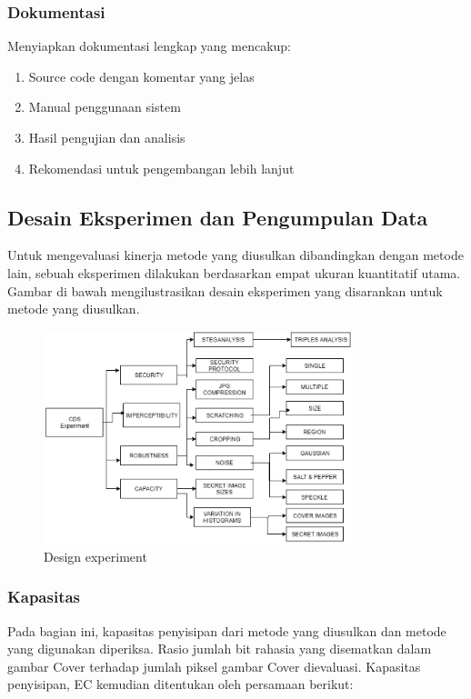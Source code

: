 \documentclass{ittelkom}
\begin{document}
\subsubsection{Dokumentasi}

Menyiapkan dokumentasi lengkap yang mencakup:

\begin{enumerate}
    \item Source code dengan komentar yang jelas
    \item Manual penggunaan sistem
    \item Hasil pengujian dan analisis
    \item Rekomendasi untuk pengembangan lebih lanjut
\end{enumerate}

\subsection{Desain Eksperimen dan Pengumpulan Data}

Untuk mengevaluasi kinerja metode yang diusulkan dibandingkan dengan metode
lain, sebuah eksperimen dilakukan berdasarkan empat ukuran kuantitatif utama.
Gambar di bawah mengilustrasikan desain eksperimen yang disarankan untuk metode
yang diusulkan.

\begin{figure}[h]
    \centering
    \includegraphics[width=0.8\textwidth]{gambar/experiment.png}
    \caption{Design experiment}
    \label{fig:experiment}
\end{figure}

\subsubsection{Kapasitas}

Pada bagian ini, kapasitas penyisipan dari metode yang diusulkan dan metode
yang digunakan diperiksa. Rasio jumlah bit rahasia yang disematkan dalam gambar
Cover terhadap jumlah piksel gambar Cover dievaluasi. Kapasitas penyisipan, EC
kemudian ditentukan oleh persamaan berikut:
\end{document}
